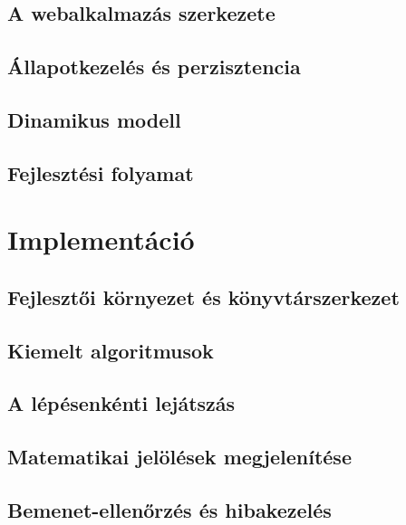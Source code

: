 \subsection{A webalkalmazás szerkezete}
\mbox{}

\subsection{Állapotkezelés és perzisztencia}
\mbox{}

\subsection{Dinamikus modell}
\mbox{}

\subsection{Fejlesztési folyamat}
\mbox{}

\section{Implementáció}

\subsection{Fejlesztői környezet és könyvtárszerkezet}
\mbox{}

\subsection{Kiemelt algoritmusok}
\mbox{}

\subsection{A lépésenkénti lejátszás}
\mbox{}

\subsection{Matematikai jelölések megjelenítése}
\mbox{}

\subsection{Bemenet-ellenőrzés és hibakezelés}
\mbox{}
